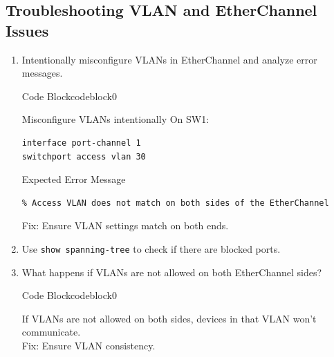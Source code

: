 \documentclass[a4paper]{article}
\begin{document}
\subsection{Troubleshooting VLAN and EtherChannel Issues}
\begin{enumerate}
	\item Intentionally misconfigure VLANs in EtherChannel and analyze error messages.


	      \begin{ocg}{Code Block}{codeblock}{0}

		      \vspace{0.5cm}
		      Misconfigure VLANs intentionally On SW1:
		      \begin{lstlisting}
interface port-channel 1
switchport access vlan 30
\end{lstlisting}

		      Expected Error Message

		      \begin{lstlisting}
% Access VLAN does not match on both sides of the EtherChannel
\end{lstlisting}

		      \begin{tcolorbox}
			      Fix: Ensure VLAN settings match on both ends.
		      \end{tcolorbox}


		      \vspace{0.5cm}
	      \end{ocg}
	\item Use \texttt{show spanning-tree} to check if there are blocked ports.


	\item What happens if VLANs are not allowed on both EtherChannel sides?



	      \begin{ocg}{Code Block}{codeblock}{0}

		      \vspace{0.5cm}


		      \begin{tcolorbox}
			      If VLANs are not allowed on both sides, devices in that VLAN won’t communicate.\\
			      Fix: Ensure VLAN consistency.
		      \end{tcolorbox}


		      \vspace{0.5cm}
	      \end{ocg}

\end{enumerate}
\end{document}
